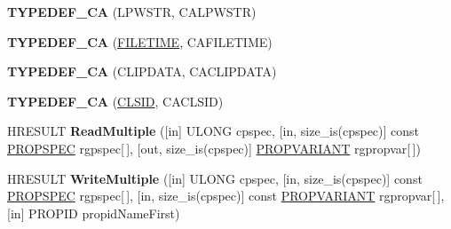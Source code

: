 \begin{DoxyCompactItemize}
\mbox{\label{interface_i_property_storage_a73d9c8797b7770bace1e3dda7a044fa9}} 
{\bfseries T\+Y\+P\+E\+D\+E\+F\+\_\+\+CA} (L\+P\+W\+S\+TR, C\+A\+L\+P\+W\+S\+TR)
\item 
\mbox{\label{interface_i_property_storage_aea10a9d16520b6914d5848c3cacc1b11}} 
{\bfseries T\+Y\+P\+E\+D\+E\+F\+\_\+\+CA} (\hyperlink{struct___f_i_l_e_t_i_m_e}{F\+I\+L\+E\+T\+I\+ME}, C\+A\+F\+I\+L\+E\+T\+I\+ME)
\item 
\mbox{\label{interface_i_property_storage_ab13612e5b9199310d9a5c14d14f581f1}} 
{\bfseries T\+Y\+P\+E\+D\+E\+F\+\_\+\+CA} (C\+L\+I\+P\+D\+A\+TA, C\+A\+C\+L\+I\+P\+D\+A\+TA)
\item 
\mbox{\label{interface_i_property_storage_a20672ebd63beacd64ac3979b324029fe}} 
{\bfseries T\+Y\+P\+E\+D\+E\+F\+\_\+\+CA} (\hyperlink{struct___i_i_d}{C\+L\+S\+ID}, C\+A\+C\+L\+S\+ID)
\item 
\mbox{\label{interface_i_property_storage_a3e289cfc6ba4b637435769e8de15d825}} 
H\+R\+E\+S\+U\+LT {\bfseries Read\+Multiple} (\mbox{[}in\mbox{]} U\+L\+O\+NG cpspec, \mbox{[}in, size\+\_\+is(cpspec)\mbox{]} const \hyperlink{struct_i_property_storage_1_1tag_p_r_o_p_s_p_e_c}{P\+R\+O\+P\+S\+P\+EC} rgpspec\mbox{[}$\,$\mbox{]}, \mbox{[}out, size\+\_\+is(cpspec)\mbox{]} \hyperlink{struct_i_property_storage_1_1tag_p_r_o_p_v_a_r_i_a_n_t}{P\+R\+O\+P\+V\+A\+R\+I\+A\+NT} rgpropvar\mbox{[}$\,$\mbox{]})
\item 
\mbox{\label{interface_i_property_storage_a722958a9adb3418eca4146ef8173f3a9}} 
H\+R\+E\+S\+U\+LT {\bfseries Write\+Multiple} (\mbox{[}in\mbox{]} U\+L\+O\+NG cpspec, \mbox{[}in, size\+\_\+is(cpspec)\mbox{]} const \hyperlink{struct_i_property_storage_1_1tag_p_r_o_p_s_p_e_c}{P\+R\+O\+P\+S\+P\+EC} rgpspec\mbox{[}$\,$\mbox{]}, \mbox{[}in, size\+\_\+is(cpspec)\mbox{]} const \hyperlink{struct_i_property_storage_1_1tag_p_r_o_p_v_a_r_i_a_n_t}{P\+R\+O\+P\+V\+A\+R\+I\+A\+NT} rgpropvar\mbox{[}$\,$\mbox{]}, \mbox{[}in\mbox{]} P\+R\+O\+P\+ID propid\+Name\+First)
\item 
\mbox{\label{interface_i_property_storage_ab79151a8c41145e74d757730b329a9e8}} 

\end{DoxyCompactItemize}
